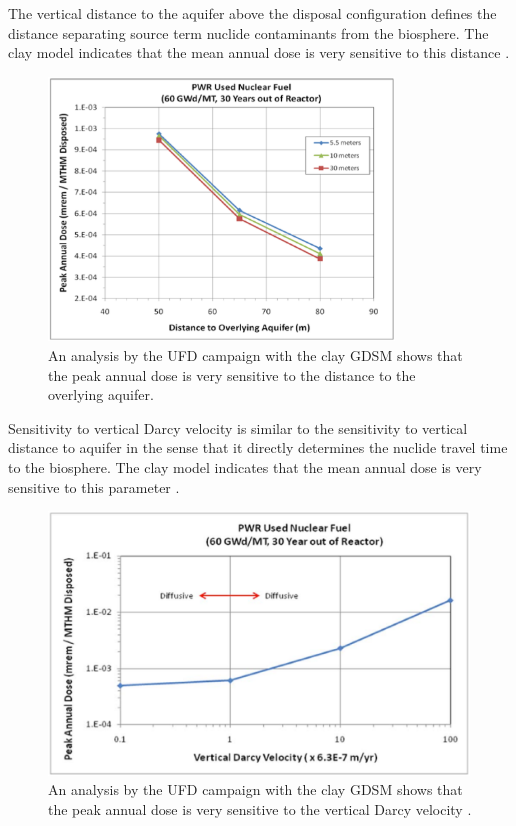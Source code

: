The vertical distance to the aquifer above the disposal configuration defines 
the distance separating source term nuclide contaminants from the biosphere. The 
clay model indicates that the mean annual dose is very sensitive to this 
distance \cite{clayton_generic_2011}.

\begin{figure}[h!]
  \begin{center}
    \includegraphics[height=7cm]{./chapters/future/overlyingDist.eps}
  \end{center}
  \caption[Distance to Aquifer Peak Dose Sensitivity]{An analysis by the UFD campaign with the clay GDSM shows that 
  the peak annual dose is very sensitive to the distance to the overlying 
  aquifer\cite{clayton_generic_2001}.}
  \label{fig:overlyingDist}
\end{figure}
\clearpage


Sensitivity to vertical Darcy velocity is similar to the sensitivity to vertical 
distance to aquifer in the sense that it directly determines the nuclide travel 
time to the biosphere. The clay model indicates that the mean annual dose is 
very sensitive to this parameter \cite{clayton_generic_2011}.

\begin{figure}[h!]
  \begin{center}
    \includegraphics[height=7cm]{./chapters/future/vertDarcyVel.eps}
  \end{center}
  \caption[Vertical Darcy Velocity Peak Dose Sensitivity]{An analysis by the UFD campaign with the clay GDSM shows that 
  the peak annual dose is very sensitive to the vertical Darcy velocity \cite{clayton_generic_2001} .}
  \label{fig:vertDarcyVel}
\end{figure}

